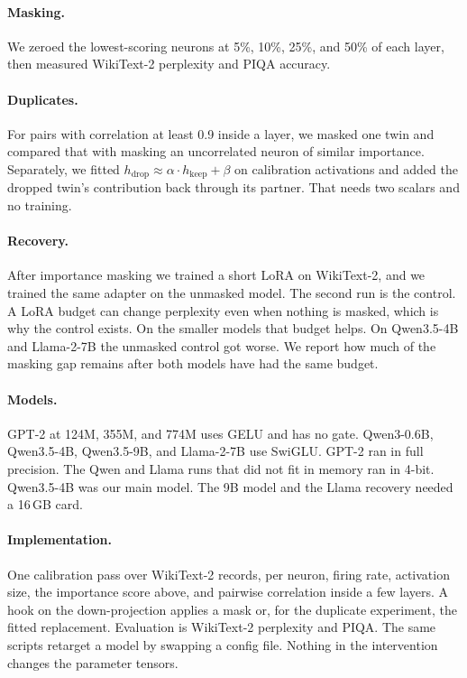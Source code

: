 \documentclass{article}
\begin{document}
\paragraph{Masking.}
We zeroed the lowest-scoring neurons at 5\%, 10\%, 25\%, and 50\% of each layer, then measured WikiText-2 perplexity and PIQA accuracy.

\paragraph{Duplicates.}
For pairs with correlation at least 0.9 inside a layer, we masked one twin and compared that with masking an uncorrelated neuron of similar importance.
Separately, we fitted $h_{\mathrm{drop}} \approx \alpha \cdot h_{\mathrm{keep}} + \beta$ on calibration activations and added the dropped twin's contribution back through its partner.
That needs two scalars and no training.

\paragraph{Recovery.}
After importance masking we trained a short LoRA on WikiText-2, and we trained the same adapter on the unmasked model.
The second run is the control.
A LoRA budget can change perplexity even when nothing is masked, which is why the control exists.
On the smaller models that budget helps.
On Qwen3.5-4B and Llama-2-7B the unmasked control got worse.
We report how much of the masking gap remains after both models have had the same budget.

\paragraph{Models.}
GPT-2 at 124M, 355M, and 774M uses GELU and has no gate.
Qwen3-0.6B, Qwen3.5-4B, Qwen3.5-9B, and Llama-2-7B use SwiGLU.
GPT-2 ran in full precision.
The Qwen and Llama runs that did not fit in memory ran in 4-bit.
Qwen3.5-4B was our main model.
The 9B model and the Llama recovery needed a 16\,GB card.

\paragraph{Implementation.}
One calibration pass over WikiText-2 records, per neuron, firing rate, activation size, the importance score above, and pairwise correlation inside a few layers.
A hook on the down-projection applies a mask or, for the duplicate experiment, the fitted replacement.
Evaluation is WikiText-2 perplexity and PIQA.
The same scripts retarget a model by swapping a config file.
Nothing in the intervention changes the parameter tensors.
\end{document}

